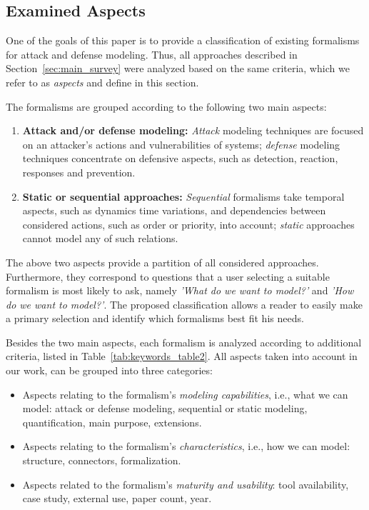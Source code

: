\documentclass[a4paper]{article}
\begin{document}
\subsection{Examined Aspects}
\label{sec:examined_aspects}

One of the goals of this paper is to provide a classification of existing
formalisms for attack and defense modeling. Thus, all approaches described in
Section~\ref{sec:main_survey} were analyzed based on the same  criteria,
which we refer to as \emph{aspects} and define in this section.

The formalisms are grouped according to the following two main aspects:
\begin{enumerate}
\item \textbf{Attack and/or defense modeling:}
\emph{Attack} modeling techniques are focused on an attacker's actions and
vulnerabilities of systems; \emph{defense} modeling techniques concentrate on 
defensive aspects, such as detection, reaction, responses and prevention. 
\item \textbf{Static or sequential approaches:} 
\emph{Sequential} formalisms take temporal aspects, such as dynamics time 
variations, and dependencies between considered actions, such as order or 
priority, into account; \emph{static} approaches cannot model any of such 
relations.
\end{enumerate}

The above two aspects provide a partition of all considered approaches. 
Furthermore, they correspond to questions that a user selecting a suitable
formalism is most likely to ask, namely \emph{'What do we want to model?'} and
\emph{'How do we want to model?'}. The proposed classification allows a reader
to easily make a primary selection and identify which formalisms best fit his 
needs. 

Besides the two main aspects, each formalism is analyzed according to 
additional criteria, listed in Table~\ref{tab:keywords_table2}. All aspects
taken into account in our work, can be grouped into three categories:
\begin{itemize}
\item Aspects relating to the formalism's \emph{modeling capabilities}, i.e., 
what we can model: attack or defense modeling, sequential or static modeling, 
quantification, main purpose, extensions.
\item Aspects relating to the formalism's \emph{characteristics}, i.e., how we 
can model: structure, connectors, formalization.
\item Aspects related to the formalism's \emph{maturity and usability}: tool
availability, case study, external use, paper count, year.
\end{itemize}
\end{document}
